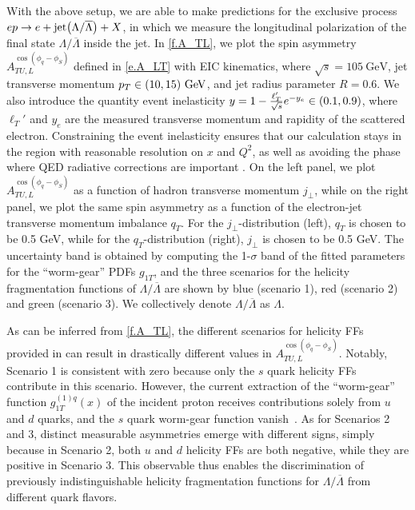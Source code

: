 \documentclass[a4paper, 11 pt]{article}
\begin{document}
With the above setup, we are able to make predictions for the exclusive process $ep \to e + \mathrm{jet}\pqty{\Lambda/\overline{\Lambda}}+X$, in which we measure the longitudinal polarization of the final state $\Lambda/\overline{\Lambda}$ inside the jet. In \cref{f.A_TL}, we plot the spin asymmetry $A_{TU, L}^{\cos(\phi _q - \phi _{S})}$ defined in \cref{e.A_LT} with EIC kinematics, where $\sqrt{s} = 105~\mathrm{GeV}$, jet transverse momentum $p_T \in \pqty{10, 15}~\mathrm{GeV}$, and jet radius parameter $R = 0.6$.
We also introduce the quantity event inelasticity $y = 1 - \frac{\ell_T'}{\sqrt{s}} e^{- y_e} \in \pqty{0.1, 0.9}$, where $\ell_T'$ and $y_e$ are the measured transverse momentum and rapidity of the scattered electron. Constraining the event inelasticity ensures that our calculation stays in the region with reasonable resolution on $x$ and $Q^2$, as well as avoiding the phase where QED radiative corrections are important \cite{Arratia:2020nxw}. On the left panel, we plot $A_{TU, L}^{\cos(\phi _q - \phi _{S})}$ as a function of hadron transverse momentum $j_{\bot}$, while on the right panel, we plot the same spin asymmetry as a function of the electron-jet transverse momentum imbalance $q_T$. For the $j_{\bot}$-distribution (left), $q_T$ is chosen to be 0.5 GeV, while for the $q_T$-distribution (right), $j_{\bot}$ is chosen to be 0.5 GeV. The uncertainty band is obtained by computing the 1-$\sigma$ band of the fitted parameters for the ``worm-gear'' PDFs $g_{1T}$, and the three scenarios for the helicity fragmentation functions of $\Lambda/\overline{\Lambda}$ are shown by blue (scenario 1), red (scenario 2) and green (scenario 3).
We collectively denote $\Lambda/\overline{\Lambda}$ as $\Lambda$.

As can be inferred from \cref{f.A_TL}, the different scenarios for helicity FFs provided in \cite{deFlorian:1997zj} can result in drastically different values in $A_{TU, L}^{\cos(\phi _q - \phi _{S})}$.
Notably, Scenario 1 is consistent with zero because only the $s$ quark helicity FFs contribute in this scenario. However, the current extraction of the ``worm-gear'' function ${g}_{1T}^{(1)q} (x)$ of the incident proton receives contributions solely from $u$ and $d$ quarks, and the $s$ quark worm-gear function vanish~\cite{Bhattacharya:2021twu}. As for Scenarios 2 and 3, distinct measurable asymmetries emerge with different signs, simply because in Scenario 2, both $u$ and $d$ helicity FFs are both negative, while they are positive in Scenario 3. This observable thus enables the discrimination of previously indistinguishable helicity fragmentation functions for $\Lambda/\overline{\Lambda}$ from different quark flavors.
\end{document}
